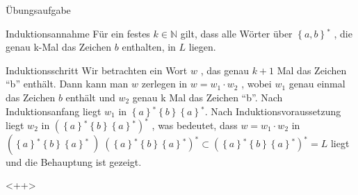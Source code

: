 \documentclass[18pt]{beamer}
\begin{document}
\begin{frame}{Übungsaufgabe}
    \begin{block}{Induktionsannahme}
        Für ein festes $k \in \mathbb{N}$ gilt, dass alle Wörter über $\left\{ a, b\right\}^∗$ , die genau k-Mal das Zeichen $b$ enthalten, in $L$ liegen.        
    \end{block}
    \begin{block}{Induktionsschritt}
        Wir betrachten ein Wort $w$ , das genau $k + 1$ Mal das Zeichen "`b"' enthält. Dann kann man $w$ zerlegen in $w = w_1 \cdot w_2$ , wobei $w_1$ genau einmal das Zeichen $b$ enthält und $w_2$ genau k Mal das Zeichen "`b"'. Nach Induktionsanfang liegt $w_1$ in $\left\{ a\right\}^∗ \left\{ b\right\}\left\{ a\right\}^∗$. Nach Induktionsvoraussetzung liegt $w_2$ in $\left(\left\{ a\right\}^∗ \left\{ b\right\}\left\{ a\right\}^∗ \right)^∗$ , was bedeutet, dass $w = w_1 \cdot w_2$ in $\left(\left\{ a\right\}^∗ \left\{ b\right\}\left\{ a\right\}^∗ \left)\left(\left\{ a\right\}^∗ \left\{ b\right\}\left\{ a\right\}^∗ \right)^∗ \subset \left(\left\{ a\right\}^∗ \left\{ b\right\}\left\{ a\right\}^∗ \right)^∗ = L$ liegt und die Behauptung ist gezeigt.
    \end{block}
\end{frame}<++>
\end{document}
